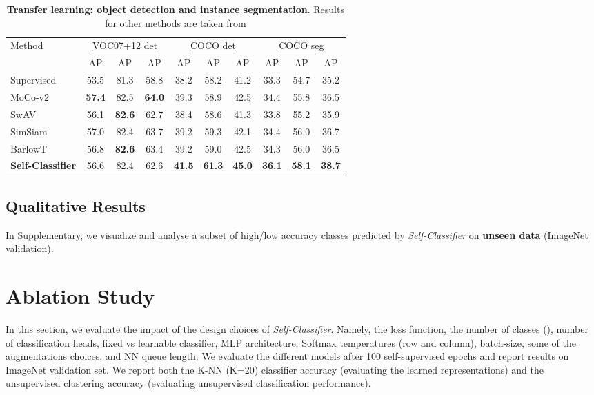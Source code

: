 \documentclass[runningheads]{llncs}
\begin{document}
\begin{table}[ht]
  \centering
  \tiny
  \caption{\textbf{Transfer learning: object detection and instance segmentation}. Results for other methods are taken from \cite{DBLP:conf/icml/ZbontarJMLD21}}
  \label{table:transfer_learning}
  \begin{tabular}{l|ccc|ccc|ccc}
    \toprule
    Method & \multicolumn{3}{c}{\underline{VOC07+12 det}} & \multicolumn{3}{c}{\underline{COCO det}} & \multicolumn{3}{c}{\underline{COCO seg}} \\
     & AP & AP & AP & AP & AP & AP & AP & AP & AP \\
    \midrule
    Supervised & 53.5 & 81.3 & 58.8 & 38.2 & 58.2 & 41.2 & 33.3 & 54.7 & 35.2 \\
    \midrule
    MoCo-v2\cite{chen2020improved} & \textbf{57.4} & 82.5 & \textbf{64.0} & 39.3 & 58.9 & 42.5 & 34.4 & 55.8 & 36.5 \\
    SwAV\cite{caron2020unsupervised} & 56.1 & \textbf{82.6} & 62.7 & 38.4 & 58.6 & 41.3 & 33.8 & 55.2 & 35.9 \\
    SimSiam\cite{chen2021exploring} & 57.0 & 82.4 & 63.7 & 39.2 & 59.3 & 42.1 & 34.4 & 56.0 & 36.7 \\
    BarlowT\cite{DBLP:conf/icml/ZbontarJMLD21} & 56.8 & \textbf{82.6} & 63.4 & 39.2 & 59.0 & 42.5 & 34.3 & 56.0 & 36.5 \\
    \midrule
    \midrule
    \textbf{Self-Classifier} & 56.6 & 82.4 & 62.6 & \textbf{41.5} & \textbf{61.3} & \textbf{45.0} & \textbf{36.1} & \textbf{58.1} & \textbf{38.7} \\
    \bottomrule
  \end{tabular}
\end{table}

\subsection{Qualitative Results}
In Supplementary, we visualize and analyse a subset of high/low accuracy classes predicted by \textit{Self-Classifier} on \textbf{unseen data} (ImageNet validation).

\section{Ablation Study}
\label{section:ablation}
In this section, we evaluate the impact of the design choices of \textit{Self-Classifier}. Namely, the loss function, the number of classes (), number of classification heads, fixed vs learnable classifier, MLP architecture, Softmax temperatures (row and column), batch-size, some of the augmentations choices, and NN queue length. We evaluate the different models after 100 self-supervised epochs and report results on ImageNet validation set. We report both the K-NN (K=20) classifier accuracy (evaluating the learned representations) and the unsupervised clustering accuracy (evaluating unsupervised classification performance).
\end{document}
